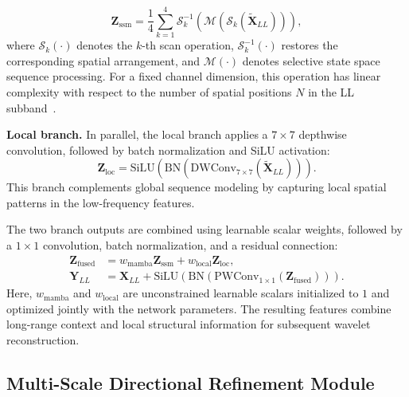 \documentclass[pdflatex,sn-nature]{sn-jnl}
\begin{document}
\begin{equation}
    \mathbf{Z}_{\mathrm{ssm}}
    =
    \frac{1}{4}\sum_{k=1}^{4}
    \mathcal{S}_{k}^{-1}\!\left(
    \mathcal{M}\!\left(
    \mathcal{S}_{k}(\tilde{\mathbf{X}}_{LL})
    \right)\right),
    \label{eq:glrm_global}
    \end{equation}
where $\mathcal{S}_{k}(\cdot)$ denotes the $k$-th scan operation, $\mathcal{S}_{k}^{-1}(\cdot)$ restores the corresponding spatial arrangement, and $\mathcal{M}(\cdot)$ denotes selective state space sequence processing. For a fixed channel dimension, this operation has linear complexity with respect to the number of spatial positions $N$ in the LL subband~\cite{Liu2024VMamba}.


\noindent\textbf{Local branch.} In parallel, the local branch applies a $7\times7$ depthwise convolution, followed by batch normalization and SiLU activation:
\begin{equation}
\mathbf{Z}_{\mathrm{loc}}
=
\mathrm{SiLU}\!\left(
\mathrm{BN}\!\left(
\mathrm{DWConv}_{7\times7}
(\tilde{\mathbf{X}}_{LL})
\right)\right).
\label{eq:glrm_local}
\end{equation}
This branch complements global sequence modeling by capturing local spatial patterns in the low-frequency features.

The two branch outputs are combined using learnable scalar weights, followed by a $1\times1$ convolution, batch normalization, and a residual connection:
\begin{equation}
\begin{aligned}
\mathbf{Z}_{\mathrm{fused}}
&=
w_{\mathrm{mamba}}\mathbf{Z}_{\mathrm{ssm}}
+
w_{\mathrm{local}}\mathbf{Z}_{\mathrm{loc}}, \\
\mathbf{Y}_{LL}
&=
\mathbf{X}_{LL}
+
\mathrm{SiLU}\!\left(
\mathrm{BN}\!\left(
\mathrm{PWConv}_{1\times1}
(\mathbf{Z}_{\mathrm{fused}})
\right)
\right).
\end{aligned}
\label{eq:glrm_fusion}
\end{equation}
Here, $w_{\mathrm{mamba}}$ and $w_{\mathrm{local}}$ are unconstrained learnable scalars initialized to $1$ and optimized jointly with the network parameters. The resulting features combine long-range context and local structural information for subsequent wavelet reconstruction.


\subsection{Multi-Scale Directional Refinement Module}
\end{document}
